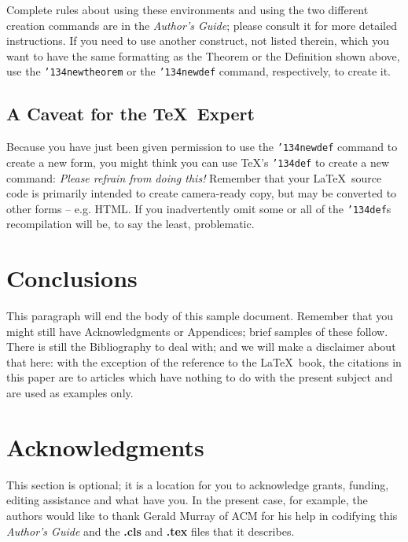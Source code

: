 \documentclass{sig-alternate}
\begin{document}
Complete rules about using these environments and using the
two different creation commands are in the
\textit{Author's Guide}; please consult it for more
detailed instructions.  If you need to use another construct,
not listed therein, which you want to have the same
formatting as the Theorem
or the Definition\cite{salas:calculus} shown above,
use the \texttt{{\char'134}newtheorem} or the
\texttt{{\char'134}newdef} command,
respectively, to create it.

\subsection*{A {\secit Caveat} for the \TeX\ Expert}
Because you have just been given permission to
use the \texttt{{\char'134}newdef} command to create a
new form, you might think you can
use \TeX's \texttt{{\char'134}def} to create a
new command: \textit{Please refrain from doing this!}
Remember that your \LaTeX\ source code is primarily intended
to create camera-ready copy, but may be converted
to other forms -- e.g. HTML. If you inadvertently omit
some or all of the \texttt{{\char'134}def}s recompilation will
be, to say the least, problematic.

\section{Conclusions}
This paragraph will end the body of this sample document.
Remember that you might still have Acknowledgments or
Appendices; brief samples of these
follow.  There is still the Bibliography to deal with; and
we will make a disclaimer about that here: with the exception
of the reference to the \LaTeX\ book, the citations in
this paper are to articles which have nothing to
do with the present subject and are used as
examples only.

\section{Acknowledgments}
This section is optional; it is a location for you
to acknowledge grants, funding, editing assistance and
what have you.  In the present case, for example, the
authors would like to thank Gerald Murray of ACM for
his help in codifying this \textit{Author's Guide}
and the \textbf{.cls} and \textbf{.tex} files that it describes.
\end{document}
